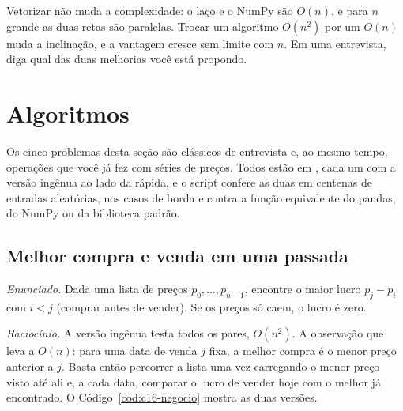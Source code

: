 
\begin{intuicao}
Vetorizar não muda a complexidade: o laço e o NumPy são $O(n)$, e para $n$ grande as duas retas são paralelas. Trocar um algoritmo $O(n^2)$ por um $O(n)$ muda a inclinação, e a vantagem cresce sem limite com $n$. Em uma entrevista, diga qual das duas melhorias você está propondo.
\end{intuicao}

\section{Algoritmos}
\label{sec:c16-algoritmos}

Os cinco problemas desta seção são clássicos de entrevista e, ao mesmo tempo, operações que você já fez com séries de preços. Todos estão em , cada um com a versão ingênua ao lado da rápida, e o script  confere as duas em centenas de entradas aleatórias, nos casos de borda e contra a função equivalente do pandas, do NumPy ou da biblioteca padrão.

\subsection{Melhor compra e venda em uma passada}

\emph{Enunciado.} Dada uma lista de preços $p_0, \dots, p_{n-1}$, encontre o maior lucro $p_j - p_i$ com $i < j$ (comprar antes de vender). Se os preços só caem, o lucro é zero.

\emph{Raciocínio.} A versão ingênua testa todos os pares, $O(n^2)$. A observação que leva a $O(n)$: para uma data de venda $j$ fixa, a melhor compra é o menor preço anterior a $j$. Basta então percorrer a lista uma vez carregando o menor preço visto até ali e, a cada data, comparar o lucro de vender hoje com o melhor já encontrado. O Código~\ref{cod:c16-negocio} mostra as duas versões.

